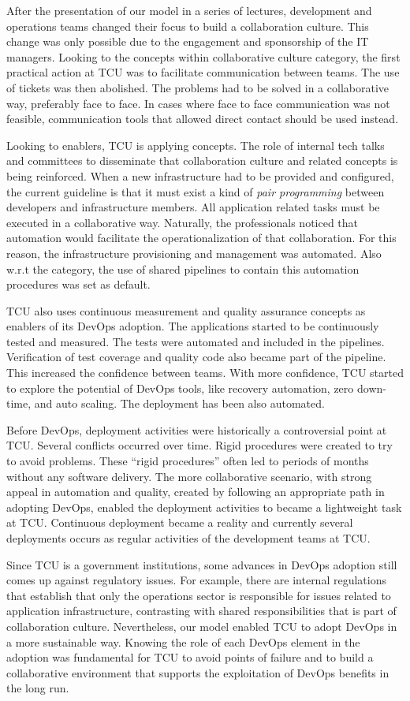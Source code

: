 After the presentation of our  model in a series of lectures, development and
operations teams changed their focus to build a collaboration culture. This
change was only possible due to the engagement and sponsorship of the IT
managers. Looking to the concepts within collaborative culture category, the first practical
action at TCU was to facilitate communication between teams. The use of tickets
was then abolished. The problems had to be solved in a collaborative way, preferably
face to face. In cases where face to face communication was not feasible,
communication tools that allowed direct contact should be used instead.

Looking to enablers, TCU is applying  concepts.
The role of internal tech talks and committees to disseminate that collaboration
culture and related concepts is being reinforced.
When a new infrastructure had to be provided and configured, the current guideline is
that it must exist a kind of \emph{pair programming} between developers and infrastructure
members. All application related tasks must be executed in a collaborative
way. Naturally, the professionals noticed that automation would facilitate the
operationalization of that collaboration. For this reason, the infrastructure provisioning
and management was automated. Also w.r.t  the  category,
the use of shared pipelines to contain this automation procedures was set as default.

TCU also uses continuous measurement and quality assurance concepts as
enablers of its DevOps adoption. The applications started to be continuously
tested and measured. The tests were automated and included in the pipelines.
Verification of test coverage and quality code also became part of the pipeline.
This increased the confidence between teams. With more confidence, TCU started
to explore the potential of DevOps tools, like recovery automation, zero
down-time, and auto scaling. The deployment has been also automated.

Before DevOps, deployment activities were historically a controversial point at TCU.
Several conflicts occurred over time. Rigid procedures were created to try to
avoid problems. These ``rigid procedures'' often led to periods of months
without any software delivery. The more collaborative scenario, with strong appeal in automation and quality,
created by following an appropriate path in adopting DevOps, enabled the deployment activities to became
a lightweight task at TCU. Continuous deployment became a reality and currently several deployments
occurs as regular activities of the development teams at TCU.

Since TCU is a government institutions, some advances in DevOps adoption still comes up
against regulatory issues. For example, there are internal regulations that
establish that only the operations sector is responsible for issues related to
application infrastructure, contrasting with shared responsibilities that is
part of collaboration culture. Nevertheless, our model enabled TCU to adopt DevOps in a more
sustainable way. Knowing the role
of each DevOps element in the adoption was fundamental for TCU to avoid points
of failure and to build a collaborative environment that supports the
exploitation of DevOps benefits in the long run.
